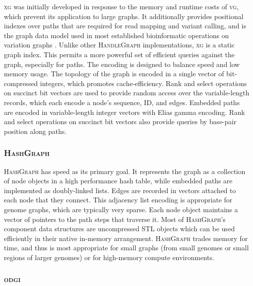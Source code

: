 \documentclass{bioinfo}
\begin{document}
\begin{methods}
\textsc{xg} was initially developed in response to the memory and runtime costs of \textsc{vg}, which prevent its application to large graphs.
It additionally provides positional indexes over paths that are required for read mapping and variant calling, and is the graph data model used in most established bioinformatic operations on variation graphs \citep{Garrison_2018,hickey2020genotyping}.
Unlike other \textsc{HandleGraph} implementations, \textsc{xg} is a static graph index.
This permits a more powerful set of efficient queries against the graph, especially for paths.
The encoding is designed to balance speed and low memory usage.
The topology of the graph is encoded in a single vector of bit-compressed integers, which promotes cache-efficiency.
Rank and select operations on succinct bit vectors are used to provide random access over the variable-length records, which each encode a node's sequence, ID, and edges.
Embedded paths are encoded in variable-length integer vectors with Elias gamma encoding.
Rank and select operations on succinct bit vectors also provide queries by base-pair position along paths.

\subsubsection{\textsc{HashGraph}}

\textsc{HashGraph} has speed as its primary goal.
It represents the graph as a collection of node objects in a high performance hash table, while embedded paths are implemented as doubly-linked lists.
Edges are recorded in vectors attached to each node that they connect.
This adjacency list encoding is appropriate for genome graphs, which are typically very sparse.
Each node object maintains a vector of pointers to the path steps that traverse it.
Most of \textsc{HashGraph}'s component data structures are uncompressed STL objects which can be used efficiently in their native in-memory arrangement.
\textsc{HashGraph} trades memory for time, and thus is most appropriate for small graphs (from small genomes or small regions of larger genomes) or for high-memory compute environments.

\subsubsection{\textsc{odgi}}


\end{methods}
\end{document}
